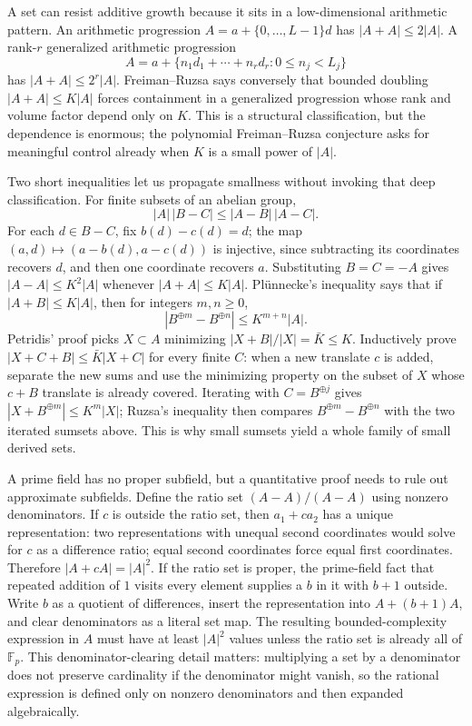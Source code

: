 \hypertarget{04-visual-computing-ii-ch033-sumsets-energy-and-robust-structure-lectures-1012}{}

A set can resist additive growth because it sits in a low-dimensional arithmetic pattern. An arithmetic progression \(A=a+\{0,\ldots,L-1\}d\) has \(|A+A|\le 2|A|\). A rank-\(r\) generalized arithmetic progression \[
A=a+\{n_1d_1+\cdots+n_rd_r:0\le n_j<L_j\}
\] has \(|A+A|\le 2^r|A|\). Freiman--Ruzsa says conversely that bounded doubling \(|A+A|\le K|A|\) forces containment in a generalized progression whose rank and volume factor depend only on \(K\). This is a structural classification, but the dependence is enormous; the polynomial Freiman--Ruzsa conjecture asks for meaningful control already when \(K\) is a small power of \(|A|\).

Two short inequalities let us propagate smallness without invoking that deep classification. For finite subsets of an abelian group, \[
|A|\,|B-C|\le |A-B|\,|A-C|.
\] For each \(d\in B-C\), fix \(b(d)-c(d)=d\); the map \((a,d)\mapsto(a-b(d),a-c(d))\) is injective, since subtracting its coordinates recovers \(d\), and then one coordinate recovers \(a\). Substituting \(B=C=-A\) gives \(|A-A|\le K^2|A|\) whenever \(|A+A|\le K|A|\). Plünnecke's inequality says that if \(|A+B|\le K|A|\), then for integers \(m,n\ge0\), \[
|B^{\oplus m}-B^{\oplus n}|\le K^{m+n}|A|.
\] Petridis' proof picks \(X\subset A\) minimizing \(|X+B|/|X|=\bar K\le K\). Inductively prove \(|X+C+B|\le\bar K|X+C|\) for every finite \(C\): when a new translate \(c\) is added, separate the new sums and use the minimizing property on the subset of \(X\) whose \(c+B\) translate is already covered. Iterating with \(C=B^{\oplus j}\) gives \(|X+B^{\oplus m}|\le K^m|X|\); Ruzsa's inequality then compares \(B^{\oplus m}-B^{\oplus n}\) with the two iterated sumsets above. This is why small sumsets yield a whole family of small derived sets.

A prime field has no proper subfield, but a quantitative proof needs to rule out approximate subfields. Define the ratio set \((A-A)/(A-A)\) using nonzero denominators. If \(c\) is outside the ratio set, then \(a_1+ca_2\) has a unique representation: two representations with unequal second coordinates would solve for \(c\) as a difference ratio; equal second coordinates force equal first coordinates. Therefore \(|A+cA|=|A|^2\). If the ratio set is proper, the prime-field fact that repeated addition of \(1\) visits every element supplies a \(b\) in it with \(b+1\) outside. Write \(b\) as a quotient of differences, insert the representation into \(A+(b+1)A\), and clear denominators as a literal set map. The resulting bounded-complexity expression in \(A\) must have at least \(|A|^2\) values unless the ratio set is already all of \(\mathbb F_p\). This denominator-clearing detail matters: multiplying a set by a denominator does not preserve cardinality if the denominator might vanish, so the rational expression is defined only on nonzero denominators and then expanded algebraically.

